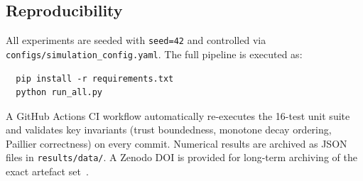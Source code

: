 \subsection{Reproducibility}

All experiments are seeded with \texttt{seed=42} and controlled
via \texttt{configs/simulation\_config.yaml}.  The full pipeline is
executed as:
%
\begin{verbatim}
  pip install -r requirements.txt
  python run_all.py
\end{verbatim}
%
A GitHub Actions CI workflow automatically re-executes the 16-test
unit suite and validates key invariants (trust boundedness,
monotone decay ordering, Paillier correctness) on every commit.
Numerical results are archived as JSON files in
\texttt{results/data/}.  A Zenodo DOI is provided for
long-term archiving of the exact artefact set~\cite{zenodo2026}.
